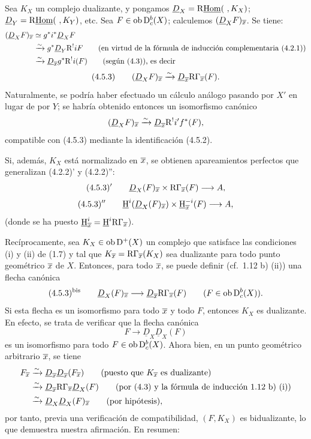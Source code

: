 Sea $K_X$ un complejo dualizante, y pongamos $\underline{D}_X=\mathrm{R}\underline{\operatorname{Hom}}(\ ,K_X)$; $\underline{D}_Y=\R\underline{\Hom}(\ ,K_Y)$, etc. Sea $F\in\operatorname{ob}\mathrm{D}_c^b(X)$; calculemos $(\underline{D}_XF)_{\overline{x}}$. Se tiene:
\[
\begin{aligned}
(\underline{D}_XF)_{\overline{x}}&\simeq g^*i^*\underline{D}_X F\\
&\xrightarrow{\sim}g^*\underline{D}_Y\mathrm{R}^{!}iF\qquad\text{(en virtud de la fórmula de inducción complementaria (4.2.1))}\\
&\xrightarrow{\sim}\underline{D}_{\overline{x}}g^*\mathrm{R}^{!}i(F)\qquad\text{(según (4.3)), es decir}
\end{aligned}
\]
\[
(4.5.3)\qquad (\underline{D}_X F)_{\overline{x}}\xrightarrow{\sim}\underline{D}_{\overline{x}}\mathrm{R}\Gamma_{\overline{x}}(F).
\]
Naturalmente, se podría haber efectuado un cálculo análogo pasando por $X'$ en lugar de por $Y$; se habría obtenido entonces un isomorfismo canónico
\[
(\underline{D}_XF)_{\overline{x}}\xrightarrow{\sim}\underline{D}_{\overline{x}}\mathrm{R}^{!}i'f^*(F),
\]
compatible con (4.5.3) mediante la identificación (4.5.2).

Si, además, $K_X$ está normalizado en $\overline{x}$, se obtienen apareamientos perfectos que generalizan (4.2.2)' y (4.2.2)'':
\[
(4.5.3)'\qquad \underline{D}_X(F)_{\overline{x}}\times \mathrm{R}\Gamma_{\overline{x}}(F)\longrightarrow A,
\]
\[
(4.5.3)''\qquad \underline{\mathrm H}^i(\underline{D}_X(F)_{\overline{x}})\times \underline{\mathrm H}_{\overline{x}}^{-i}(F)\longrightarrow A,
\]
(donde se ha puesto $\underline{\mathrm H}_{\overline{x}}^i=\underline{\mathrm H}^i\mathrm{R}\Gamma_{\overline{x}}$).

Recíprocamente, sea $K_X\in\operatorname{ob}\mathrm{D}^+(X)$ un complejo que satisface las condiciones (i) y (ii) de (1.7) y tal que $K_{\overline{x}}=\mathrm{R}\Gamma_{\overline{x}}(K_X)$ sea dualizante para todo punto geométrico $\overline{x}$ de $X$. Entonces, para todo $\overline{x}$, se puede definir (cf.~1.12 b) (ii)) una flecha canónica
\[
(4.5.3)^{\mathrm{bis}}\qquad \underline{D}_X(F)_{\overline{x}}\longrightarrow \underline{D}_{\overline{x}}\mathrm{R}\Gamma_{\overline{x}}(F)\qquad (F\in\operatorname{ob}\mathrm{D}_c^b(X)).
\]
Si esta flecha es un isomorfismo para todo $\overline{x}$ y todo $F$, entonces $K_X$ es dualizante. En efecto, se trata de verificar que la flecha canónica
\[
F\longrightarrow \underline{D}_X\underline{D}_X(F)
\]
es un isomorfismo para todo $F\in\operatorname{ob}\mathrm{D}_c^b(X)$. Ahora bien, en un punto geométrico arbitrario $\overline{x}$, se tiene
\[
\begin{aligned}
F_{\overline{x}}&\xrightarrow{\sim}\underline{D}_{\overline{x}}\underline{D}_{\overline{x}}(F_{\overline{x}})\qquad\text{(puesto que $K_{\overline{x}}$ es dualizante)}\\
&\xrightarrow{\sim}\underline{D}_{\overline{x}}\mathrm{R}\Gamma_{\overline{x}}\underline{D}_X(F)\qquad\text{(por (4.3) y la fórmula de inducción 1.12 b) (i))}\\
&\xrightarrow{\sim}\underline{D}_X\underline{D}_X(F)_{\overline{x}}\qquad\text{(por hipótesis)},
\end{aligned}
\]
por tanto, previa una verificación de compatibilidad, $(F,K_X)$ es bidualizante, lo que demuestra nuestra afirmación. En resumen:

